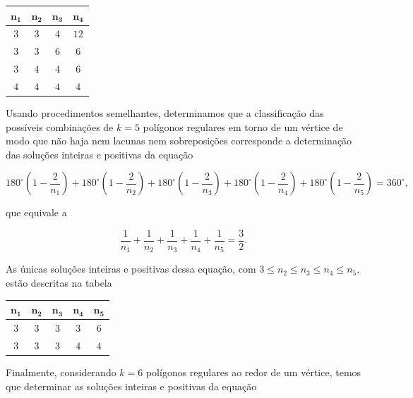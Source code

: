 \begin{table}[H]
\centering
\setlength\tabcolsep{5mm}
\begin{tabu} to \textwidth{|c|c|c|c|}
\hline
$\bm{n_1}$ & $\bm{n_2}$ & $\bm{n_3}$ & $\bm{n_4}$ \\
\hline
$3$ & $3$ & $4$ & $12$ \\
\hline
$3$ & $3$ & $6$ & $6$ \\
\hline
$3$ & $4$ & $4$ & $6$ \\
\hline
$4$ & $4$ & $4$ & $4$ \\
\hline
\end{tabu}
\end{table}

Usando procedimentos semelhantes, determinamos que a classificação das possíveis combinações de $k=5$ polígonos regulares em torno de um vértice de modo que não haja nem lacunas nem sobreposições corresponde a determinação das soluções inteiras e positivas da equação

\begin{equation*}
180^{\circ}\left(1-\frac{2}{n_1}\right)+180^{\circ}\left(1-\frac{2}{n_2}\right)+180^{\circ}\left(1-\frac{2}{n_3}\right)+180^{\circ}\left(1-\frac{2}{n_4}\right)+180^{\circ}\left(1-\frac{2}{n_5}\right)=360^{\circ},
\end{equation*}

que equivale a 

\begin{equation*}
\frac{1}{n_1}+\frac{1}{n_2}+\frac{1}{n_3}+\frac{1}{n_4}+\frac{1}{n_5}=\frac{3}{2}.
\end{equation*}

As únicas soluções inteiras e positivas dessa equação, com $3\leq n_2 \leq n_3 \leq n_4 \leq n_5$, estão descritas na tabela

\begin{table}[H]
\centering
\setlength\tabcolsep{5mm}
\begin{tabu} to \textwidth{|c|c|c|c|c|}
\hline
$\bm{n_1}$ & $\bm{n_2}$ & $\bm{n_3}$ & $\bm{n_4}$ & $\bm{n_5}$ \\
\hline
$3$ & $3$ & $3$ & $3$ & $6$ \\
\hline
$3$ & $3$ & $3$ & $4$ & $4$ \\
\hline
\end{tabu}
\end{table}

Finalmente, considerando $k=6$ polígonos regulares ao redor de um vértice, temos que determinar as soluções inteiras e positivas da equação

